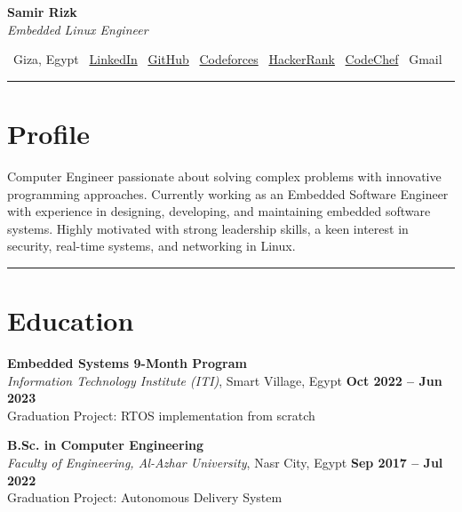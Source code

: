 \documentclass[a4paper,10pt]{article}
\begin{document}
\begin{center}
    {\Huge \textbf{Samir Rizk}} \\
    \vspace{2mm}
    \textcolor{headerblue}{\textit{Embedded Linux Engineer}} \\
\end{center}

\begin{center}
    \faMapMarker \ Giza, Egypt \quad
    \faLinkedin \ \href{https://www.linkedin.com/in/samir-rizk-3174b4207/}{LinkedIn} \quad
    \faGithub \ \href{https://github.com/SamRizk}{GitHub} \quad
    \faCode \ \href{https://codeforces.com/profile/SaMir_R_}{Codeforces} \quad
    \faHackerrank \ \href{https://www.hackerrank.com/profile/samir9999live}{HackerRank} \quad
    \faCode \ \href{https://www.codechef.com/users/samir_9999}{CodeChef} \quad
    \faEnvelope \ Gmail
\end{center}

\noindent\rule{\linewidth}{0.5mm} %

\vspace{-3mm}
\section*{Profile}
Computer Engineer passionate about solving complex problems with innovative programming approaches. Currently working as an Embedded Software Engineer with experience in designing, developing, and maintaining embedded software systems. Highly motivated with strong leadership skills, a keen interest in security, real-time systems, and networking in Linux.

\noindent\rule{\linewidth}{0.3mm} %

\section*{Education}
\noindent
\textbf{Embedded Systems 9-Month Program} \\
\textit{Information Technology Institute (ITI)}, Smart Village, Egypt \hfill \textbf{Oct 2022 – Jun 2023} \\
\textcolor{sectiongray}{Graduation Project: RTOS implementation from scratch}

\vspace{1mm}
\noindent
\textbf{B.Sc. in Computer Engineering} \\
\textit{Faculty of Engineering, Al-Azhar University}, Nasr City, Egypt \hfill \textbf{Sep 2017 – Jul 2022} \\
\textcolor{sectiongray}{Graduation Project: Autonomous Delivery System}
\end{document}
